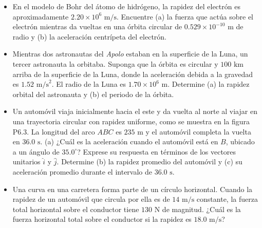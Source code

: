 \documentclass[11pt,a4paper]{article}
\begin{document}
\begin{itemize}
    \item[\textbf{1.}] En el modelo de Bohr del átomo de hidrógeno, la rapidez del electrón es aproximadamente $2.20 \times 10^6 \text{ m/s}$. Encuentre (a) la fuerza que actúa sobre el electrón mientras da vueltas en una órbita circular de $0.529 \times 10^{-10} \text{ m}$ de radio y (b) la aceleración centrípeta del electrón.
    \vspace*{6cm}

    \item[\textbf{2.}] Mientras dos astronautas del \textit{Apolo} estaban en la superficie de la Luna, un tercer astronauta la orbitaba. Suponga que la órbita es circular y $100 \text{ km}$ arriba de la superficie de la Luna, donde la aceleración debida a la gravedad es $1.52 \text{ m/s}^2$. El radio de la Luna es $1.70 \times 10^6 \text{ m}$. Determine (a) la rapidez orbital del astronauta y (b) el periodo de la órbita.
    \vspace*{6cm}

    \item[\textbf{3.}] Un automóvil viaja inicialmente hacia el este y da vuelta al norte al viajar en una trayectoria circular con rapidez uniforme, como se muestra en la figura P6.3. La longitud del arco $ABC$ es $235 \text{ m}$ y el automóvil completa la vuelta en $36.0 \text{ s}$. (a) ¿Cuál es la aceleración cuando el automóvil está en $B$, ubicado a un ángulo de $35.0^\circ$? Exprese su respuesta en términos de los vectores unitarios $\hat{i}$ y $\hat{j}$. Determine (b) la rapidez promedio del automóvil y (c) su aceleración promedio durante el intervalo de $36.0 \text{ s}$.
    \vspace*{8cm}

    \item[\textbf{4.}] Una curva en una carretera forma parte de un círculo horizontal. Cuando la rapidez de un automóvil que circula por ella es de $14 \text{ m/s}$ constante, la fuerza total horizontal sobre el conductor tiene $130 \text{ N}$ de magnitud. ¿Cuál es la fuerza horizontal total sobre el conductor si la rapidez es $18.0 \text{ m/s}$?
    \vspace*{5cm}
\end{itemize}

\newpage
\end{document}
